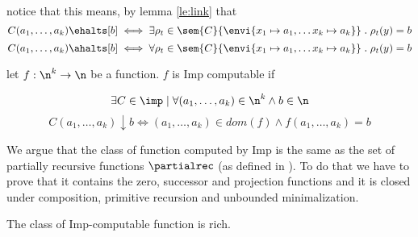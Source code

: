 \begin{observation}
  notice that this means, by lemma \ref{le:link} that \[C(a_1, \dots,
  a_k) \ehalts[b] \iff \exists \rho_t \in \sem{C}\{\envi{x_1 \mapsto
    a_1, \dots x_k \mapsto a_k}\} \; . \; \rho_t(y) = b\] \[C(a_1,
  \dots, a_k) \ahalts[b] \iff \forall \rho_t \in \sem{C}\{\envi{x_1
    \mapsto a_1, \dots x_k \mapsto a_k}\} \; . \; \rho_t(y) = b\]
\end{observation}


\begin{definition}
  let \(f : \n^k \to \n\) be a function. \(f\) is Imp computable if

  \[\exists C \in\imp \mid \forall (a_1, \dots, a_k) \in \n^k \wedge
  b \in \n \] \[C(a_1, \dots, a_k) \downarrow b \iff (a_1, \dots,
  a_k) \in dom(f) \wedge f(a_1,\dots,a_k) = b\]
\end{definition}

We argue that the class of function computed by Imp is the same as the
set of partially recursive functions \(\partialrec\) (as defined in
\cite{cutland1980computability}). To do that we have to prove that it
contains the zero, successor and projection functions and it is closed
under composition, primitive recursion and unbounded minimalization.

\begin{lemma}
  The class of Imp-computable function is rich.
\end{lemma}

